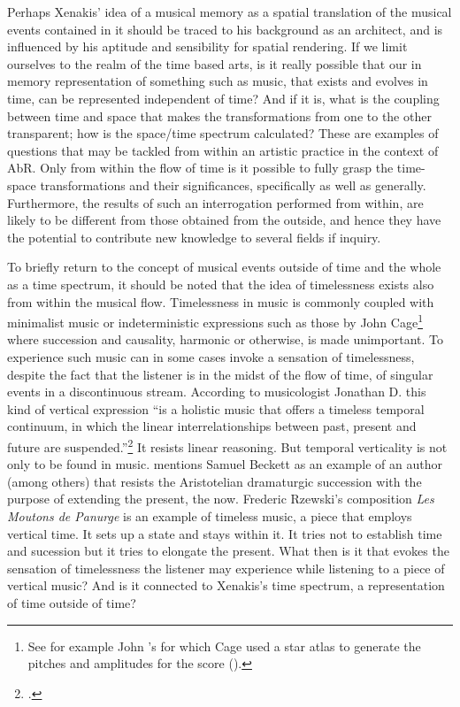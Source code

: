 Perhaps Xenakis' idea of a musical memory as a spatial translation of the musical events contained in it should be traced to his background as an architect, and is influenced by his aptitude and sensibility for spatial rendering. If we limit ourselves to the realm of the time based arts, is it really possible that our in memory representation of something such as music, that exists and evolves in time, can be represented independent of time? And if it is, what is the coupling between time and space that makes the transformations from one to the other transparent; how is the space/time spectrum calculated? These are examples of questions that may be tackled from within an artistic practice in the context of AbR. Only from within the flow of time is it possible to fully grasp the time-space transformations and their significances, specifically as well as generally. Furthermore, the results of such an interrogation performed from within, are likely to be different from those obtained from the outside, and hence they have the potential to contribute new knowledge to several fields if inquiry.

To briefly return to the concept of musical events outside of time and the whole as a time spectrum, it should be noted that the idea of timelessness exists also from within the musical flow. Timelessness in music is commonly coupled with minimalist music or indeterministic expressions such as those by John Cage\footnote{See for example John \citeauthor{cage62:atlas}'s for which Cage used a star atlas to generate the pitches and amplitudes for the score (\cite{cage62:atlas}).} where succession and causality, harmonic or otherwise, is made unimportant. To experience such music can in some cases invoke a sensation of timelessness, despite the fact that the listener is in the midst of the flow of time, of singular events in a discontinuous stream. According to musicologist Jonathan D. \citeauthor{kramer88} this kind of vertical expression ``is a holistic music that offers a timeless temporal continuum, in which the linear interrelationships between past, present and future are suspended.''\footcite{kramer88} It resists linear reasoning. But temporal verticality is not only to be found in music. \citeauthor{kramer88} mentions Samuel Beckett as an example of an author (among others) that resists the Aristotelian dramaturgic succession with the purpose of extending the present, the now.
Frederic Rzewski's composition \emph{Les Moutons de Panurge} is an example of timeless music, a piece that employs vertical time. It sets up a state and stays within it. It tries not to establish time and sucession but it tries to elongate the present. What then is it that evokes the sensation of timelessness the listener may experience while listening to a piece of vertical music? And is it connected to Xenakis's time spectrum, a representation of time outside of time?

